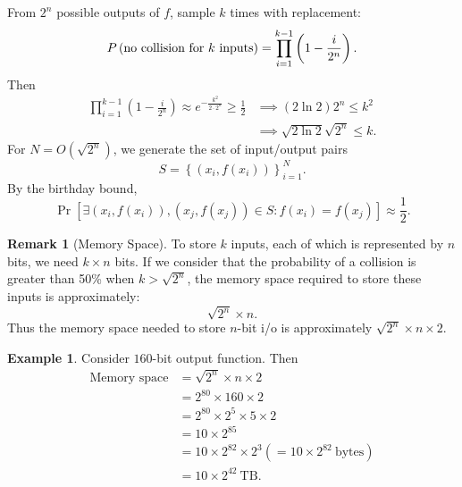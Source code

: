 \documentclass[12pt,openany]{book}
\theoremstyle{definition}
\newtheorem{remark}{Remark}[chapter]
\newtheorem{example}{Example}[chapter]
\newcommand{\set}[1]{\left\{#1\right\}}
\newcommand{\of}[1]{\left( #1 \right)}
\begin{document}
	From $2^n$ possible outputs of $f$, sample $k$ times with replacement: \[
	P\of{\textnormal{no collision for $k$ inputs}}=\prod_{i=1}^{k-1}\of{1-\frac{i}{2^n}}.
	\]
	Then \begin{align*}
		\prod_{i=1}^{k-1}\of{1-\frac{i}{2^n}}\approx e^{-\frac{k^2}{2\cdot 2^n}}\geq\frac{1}{2}
		&\implies (2\ln2)2^n\leq k^2\\
		&\implies \sqrt{2\ln2}\sqrt{2^n}\leq k.
	\end{align*}
	For $N=O(\sqrt{2^n})$, we generate the set of input/output pairs \[
	S=\set{\of{x_i,f\of{x_i}}}_{i=1}^N.
	\] By the birthday bound, \[
	\Pr[\exists(x_i,f(x_i)),(x_j,f(x_j))\in S:f(x_i)=f(x_j)]\approx\frac{1}{2}.
	\]
	\vspace{8pt}
	\begin{remark}[Memory Space]
		To store $k$ inputs, each of which is represented by $n$ bits, we need $k \times n$ bits. If we consider that the probability of a collision is greater than 50\% when $k > \sqrt{2^n}$, the memory space required to store these inputs is approximately: \[
		\sqrt{2^n}\times n.
		\] Thus the memory space needed to store $n$-bit i/o is approximately $\sqrt{2^n}\times n\times 2$.
	\end{remark}
	\vspace{8pt}
	\begin{example}
		Consider $160$-bit output function. Then 
		\begin{align*}
			\text{Memory space} &= \sqrt{2^n} \times n \times 2 \\
			&= 2^{80} \times 160 \times 2 \\
			&= 2^{80} \times 2^5\times 5 \times 2 \\
			&= 10\times 2^{85}\\
			&= 10\times 2^{82} \times 2^3 (= 10\times 2^{82}\ \text{bytes})\\
			&= 10 \times 2^{42}\ \text{TB}.
		\end{align*}
	\end{example}
	
	\newpage
\end{document}
